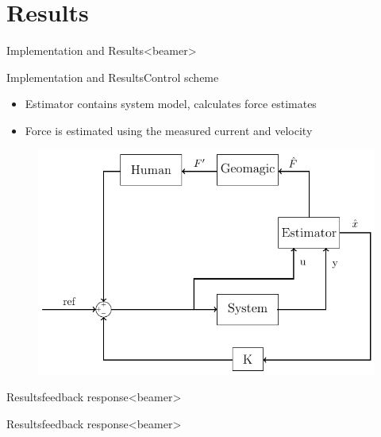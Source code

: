 \section{Results}

\begin{frame}{Implementation and Results}{}<beamer>

\end{frame}

\begin{frame}{Implementation and Results}{Control scheme}
  \begin{itemize}
    \item Estimator contains system model, calculates force estimates
    \item Force is estimated using the measured current and velocity
    \end{itemize}
	\begin{figure}
	\centering
	\includegraphics[scale=0.7]{Billeder/kalman_control}
	\end{figure}
\end{frame}


\begin{frame}{Results}{feedback response}<beamer>

\begin{figure}
\centering

\end{figure}
\end{frame}

\begin{frame}{Results}{feedback response}<beamer>

\begin{figure}
\centering

\end{figure}
\end{frame}

